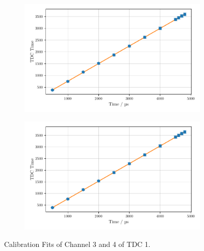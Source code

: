 \begin{figure}
    \centering
    \begin{subfigure}[b]{0.48\textwidth}
        \includegraphics[width=\textwidth]{plots/tdc2.pdf}
    \end{subfigure}\hfill
    \begin{subfigure}[b]{0.48\textwidth}
        \includegraphics[width=\textwidth]{plots/tdc3.pdf}
    \end{subfigure}
    \caption{Calibration Fits of Channel 3 and 4 of TDC 1.}
    \label{fig:tdc23}
\end{figure}
